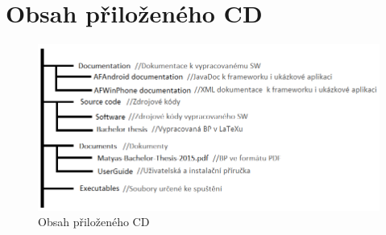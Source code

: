 \documentclass[11pt,twoside,a4paper]{book}
\begin{document}
%



%
{
\def\CS{$\cal C\kern-0.1667em\lower.5ex\hbox{$\cal S$}\kern-0.075em $}

}
\appendix	

\printnomenclature
\label{apx:zkratky}

\label{apx:install}

\label{apx:uml}

\label{apx:code}


\chapter{Obsah přiloženého CD}

\begin{figure}[h]
\begin{center}
\includegraphics[width=\textwidth]{figures/obsahCD}
\caption{Obsah přiloženého CD}
\label{fig:obsahCD}
\end{center}
\end{figure}
\end{document}
